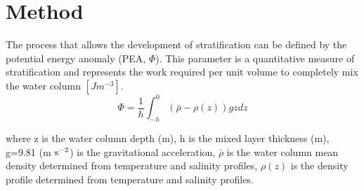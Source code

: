 \section{Method}
\label{sec:method}

The process that allows the development of stratification can be defined by the potential energy anomaly (PEA, $\Phi$). This parameter is a quantitative measure of stratification and represents the work required per unit volume to completely mix
the water column $[Jm^{-3}]$. \\

\begin{equation*}
     \Phi=\frac{1}{h}\int_{-h}^{0}(\bar{\rho}-\rho(z))gzdz 
\end{equation*}

\noindent where z is the water column depth (m), h is the mixed layer thickness (m), g=9.81 (m $\rm s^{-2}$) is the gravitational acceleration, $\bar{\rho}$ is the water column mean density determined from temperature and salinity profiles, $\rho(z)$ is the density profile determined from temperature and salinity 
profiles. 